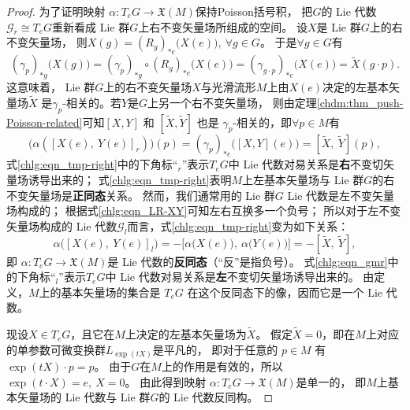 \begin{proof}
    
    为了证明映射 $\alpha: T_e G \rightarrow \mathfrak{X}(M)$保持Poisson括号积，
    把$G$的 Lie 代数$\mathscr{G}_r\cong T_e G$重新看成 Lie 群$G$上右不变矢量场所组成的空间。
    设$X$是 Lie 群$G$上的右不变矢量场，
    则$X(g)= (R_g)_{*e}\bigl(X(e)\bigr), \ \forall g \in G $。
    于是$\forall g \in G$有
    \begin{equation*}
        (\gamma_p)_{* g}\bigl(X(g)\bigr) = (\gamma_p)_{* g} \circ (R_g)_{* e}\bigl(X(e)\bigr) 
        =(\gamma_{g\cdot p})_{* e}\bigl(X(e)\bigr)  =\widetilde{X}(g \cdot p) .
    \end{equation*}
    这意味着， Lie 群$G$上的右不变矢量场$X$与光滑流形$M$上由$X(e)$决定的左基本矢量场$\widetilde{X}$
    是$\gamma_{p}$-相关的。若$Y$是$G$上另一个右不变矢量场，
    则由定理\ref{chdm:thm_push-Poisson-related}可知$[X, Y]$ 和 $[\widetilde{X}, \widetilde{Y}]$
    也是 $\gamma_{p}$-相关的，即$\forall p \in M$有
    \begin{equation}\label{chlg:eqn_tmp-right}
        \bigl(\alpha\left([X(e),\ Y(e)]_r\right)\bigr)(p)
        =(\gamma_p)_{*e}\bigl([X, Y](e)\bigr)
        =[\widetilde{X},\ \widetilde{Y}](p),
    \end{equation}
    式\eqref{chlg:eqn_tmp-right}中的下角标“${}_r$”表示$T_e G$中 Lie 代数对易关系是\textbf{右}不变切矢量场诱导出来的；
    式\eqref{chlg:eqn_tmp-right}表明$M$上左基本矢量场与 Lie 群$G$的右不变矢量场是\textbf{正同态}关系。
    然而，我们通常用的 Lie 群$G$ Lie 代数是左不变矢量场构成的；
    根据式\eqref{chlg:eqn_LR-XY}可知左右互换多一个负号；
    所以对于左不变矢量场构成的 Lie 代数$\mathscr{G}_l$而言，式\eqref{chlg:eqn_tmp-right}变为如下关系：
    \begin{equation}\label{chlg:eqn_gmr}
        \alpha\bigl([X(e),\ Y(e)]_l\bigr)=-\bigl[\alpha\bigl(X(e)\bigr),\ \alpha\bigl(Y(e)\bigr)\bigr]
        =-[\widetilde{X},\ \widetilde{Y}],
    \end{equation}
    即 $\alpha: T_e G \rightarrow \mathfrak{X}(M)$是 Lie 代数的\textbf{反同态}（“反”是指负号）。
    式\eqref{chlg:eqn_gmr}中的下角标“${}_l$”表示$T_e G$中 Lie 代数对易关系是\textbf{左}不变切矢量场诱导出来的。
    由定义，$M$上的基本矢量场的集合是 $T_e G$ 在这个反同态下的像，因而它是一个 Lie 代数。
    
    现设$X \in T_e G$，且它在$M$上决定的左基本矢量场为$\widetilde{X}$。
    假定$\widetilde{X}=0$，即在$M$上对应的单参数可微变换群$L_{\exp (t X)}$是平凡的，
    即对于任意的 $p \in M$ 有$ \exp (t  X)\cdot p=p$。
    由于$G$在$M$上的作用是有效的，所以
    $ \exp (t \cdot X)=e, \ X=0 $。
    由此得到映射 $\alpha: T_{e} G \rightarrow \mathfrak{X}(M)$是单一的，
    即$M$上基本矢量场的 Lie 代数与 Lie 群$G$的 Lie 代数反同构。
\end{proof}

